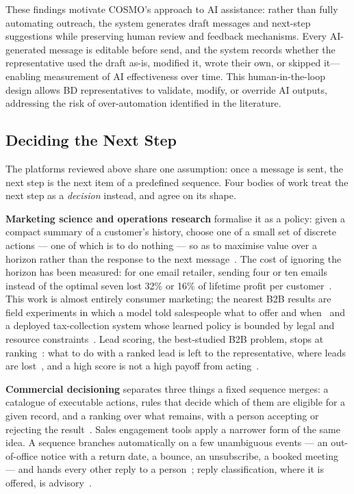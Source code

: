 \documentclass[a4paper]{article}
\begin{document}
These findings motivate COSMO's approach to AI assistance: rather than 
fully automating outreach, the system generates draft messages and 
next-step suggestions while preserving human review and feedback 
mechanisms. Every AI-generated message is editable before send, and 
the system records whether the representative used the draft as-is, 
modified it, wrote their own, or skipped it---enabling measurement 
of AI effectiveness over time. This human-in-the-loop design allows 
BD representatives to validate, modify, or override AI outputs, 
addressing the risk of over-automation identified in the literature.

\subsection{Deciding the Next Step}
\label{sec:lit-nextstep}

The platforms reviewed above share one assumption: once a message is sent,
the next step is the next item of a predefined sequence. Four bodies of work
treat the next step as a \emph{decision} instead, and agree on its shape.

\textbf{Marketing science and operations research} formalise it as a policy:
given a compact summary of a customer's history, choose one of a small set of
discrete actions --- one of which is to do nothing --- so as to maximise value
over a horizon rather than the response to the next
message~\cite{pednault2002sequential, simester2006dynamic, tkachenko2015crm}.
The cost of ignoring the horizon has been measured: for one email retailer,
sending four or ten emails instead of the optimal seven lost 32\% or 16\% of
lifetime profit per customer~\cite{zhang2017email}. This work is almost
entirely consumer marketing; the nearest B2B results are field experiments in
which a model told salespeople what to offer and
when~\cite{kumar2008customerfocused} and a deployed tax-collection system
whose learned policy is bounded by legal and resource
constraints~\cite{miller2012tax}. Lead scoring, the best-studied B2B problem,
stops at ranking~\cite{wu2023leadscoring, duncan2015funnel}: what to do with a
ranked lead is left to the representative, where leads are
lost~\cite{sabnis2013sales}, and a high score is not a high payoff from
acting~\cite{ascarza2018retention}.

\textbf{Commercial decisioning} separates three things a fixed sequence
merges: a catalogue of executable actions, rules that decide which of them
are eligible for a given record, and a ranking over what remains, with a
person accepting or rejecting the result~\cite{salesforce_nba_about}. Sales
engagement tools apply a narrower form of the same idea. A sequence
branches automatically on a few unambiguous events --- an out-of-office
notice with a return date, a bounce, an unsubscribe, a booked meeting --- and
hands every other reply to a person~\cite{outreach_rulesets, outreach_ooo_faq,
hubspot_sequence_unenroll, gong_flows}; reply classification, where it is
offered, is advisory~\cite{outreach_sentiment_classification}.
\end{document}

